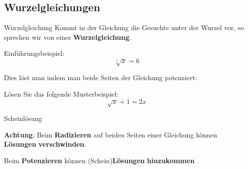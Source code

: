 
\subsection{Wurzelgleichungen}


\begin{definition}{Wurzelgleichung}{}
Kommt in der Gleichung die Gesuchte unter der Wurzel vor, so sprechen
wir von einer \textbf{Wurzelgleichung}.
\end{definition}
Einführungsbeispiel:
$$\sqrt[5]{x}=6$$


Dies löst man indem man beide Seiten der Gleichung potenziert:

Lösen Sie das folgende Musterbeispiel:
$$\sqrt{x}+1=2x$$


\platzFuerBerechnungenBisEndeSeite{}


\newpage
\begin{bemerkung}{Scheinlösung}{}
  
\textbf{Achtung}: Beim \textbf{Radizieren} auf beiden Seiten
einer Gleichung können \textbf{Lösungen} \textbf{verschwinden}.

Beim \textbf{Potenzieren} können (Schein)\textbf{Lösungen}
\textbf{hinzukommen} .
\end{bemerkung}


